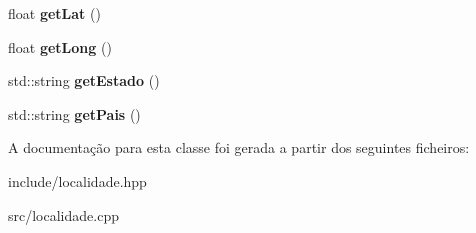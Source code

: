 \begin{DoxyCompactItemize}
\mbox{\label{classLocalidade_a1548cf9f09eca346af5bdcc4c6f222b6}} 
float {\bfseries get\+Lat} ()
\item 
\mbox{\label{classLocalidade_a97a3f7eabe1cf45e3f0bed721d4641d4}} 
float {\bfseries get\+Long} ()
\item 
\mbox{\label{classLocalidade_a3e32ae1802d8bd09568599f5133028d3}} 
std\+::string {\bfseries get\+Estado} ()
\item 
\mbox{\label{classLocalidade_a03249330040cf75b6a964cced77526cf}} 
std\+::string {\bfseries get\+Pais} ()
\end{DoxyCompactItemize}


A documentação para esta classe foi gerada a partir dos seguintes ficheiros\+:\begin{DoxyCompactItemize}
\item 
include/localidade.\+hpp\item 
src/localidade.\+cpp\end{DoxyCompactItemize}
